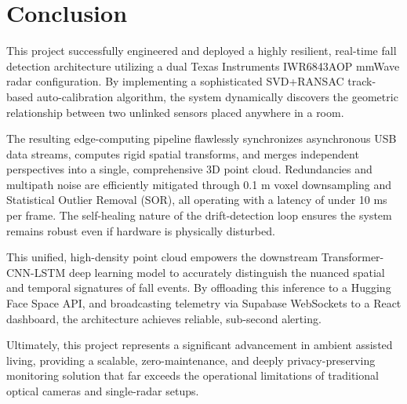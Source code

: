 \chapter{Conclusion}
This project successfully engineered and deployed a highly resilient, real-time fall detection architecture utilizing a dual Texas Instruments IWR6843AOP mmWave radar configuration. By implementing a sophisticated SVD+RANSAC track-based auto-calibration algorithm, the system dynamically discovers the geometric relationship between two unlinked sensors placed anywhere in a room. 

The resulting edge-computing pipeline flawlessly synchronizes asynchronous USB data streams, computes rigid spatial transforms, and merges independent perspectives into a single, comprehensive 3D point cloud. Redundancies and multipath noise are efficiently mitigated through 0.1 m voxel downsampling and Statistical Outlier Removal (SOR), all operating with a latency of under 10 ms per frame. The self-healing nature of the drift-detection loop ensures the system remains robust even if hardware is physically disturbed.

This unified, high-density point cloud empowers the downstream Transformer-CNN-LSTM deep learning model to accurately distinguish the nuanced spatial and temporal signatures of fall events. By offloading this inference to a Hugging Face Space API, and broadcasting telemetry via Supabase WebSockets to a React dashboard, the architecture achieves reliable, sub-second alerting. 

Ultimately, this project represents a significant advancement in ambient assisted living, providing a scalable, zero-maintenance, and deeply privacy-preserving monitoring solution that far exceeds the operational limitations of traditional optical cameras and single-radar setups.
